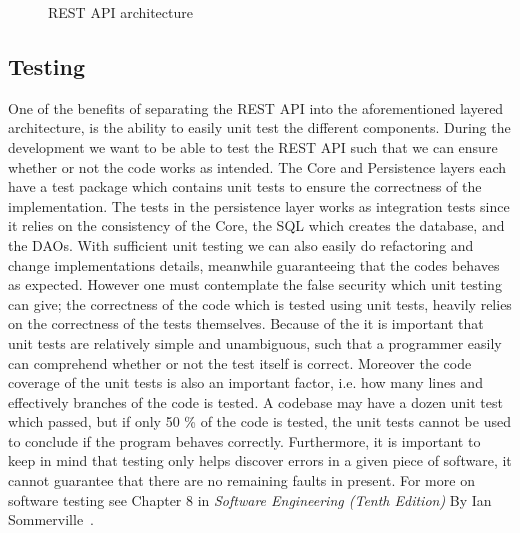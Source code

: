 \begin{figure}[h]
    \centering
    
    \caption{REST API architecture}
    \label{fig:rest-architecture}
\end{figure}


\subsection{Testing}
One of the benefits of separating the REST API into the aforementioned layered architecture, is the ability to easily unit test the different components.
During the development we want to be able to test the REST API such that we can ensure whether or not the code works as intended.
The Core and Persistence layers each have a test package which contains unit tests to ensure the correctness of the implementation.
The tests in the persistence layer works as integration tests since it relies on the consistency of the Core, the SQL which creates the database, and the DAOs.
With sufficient unit testing we can also easily do refactoring and change implementations details, meanwhile guaranteeing that the codes behaves as expected.
However one must contemplate the false security which unit testing can give; the correctness of the code which is tested using unit tests, heavily relies on the correctness of the tests themselves.
Because of the it is important that unit tests are relatively simple and unambiguous, such that a programmer easily can comprehend whether or not the test itself is correct.
Moreover the code coverage of the unit tests is also an important factor, i.e. how many lines and effectively branches of the code is tested.
A codebase may have a dozen unit test which passed, but if only 50 \% of the code is tested, the unit tests cannot be used to conclude if the program behaves correctly.
Furthermore, it is important to keep in mind that testing only helps discover errors in a given piece of software, it cannot guarantee that there are no remaining faults in present. For more on software testing see Chapter 8 in \textit{Software Engineering (Tenth Edition)} By Ian Sommerville~\cite[Chapter~8]{SEBOOK}.

